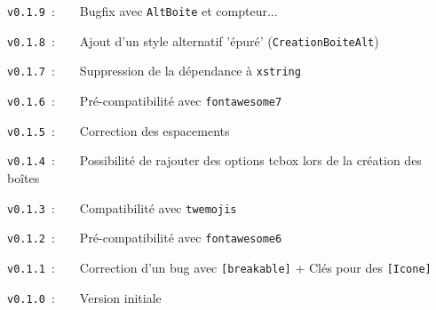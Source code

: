 \documentclass[french,11pt,a4paper]{article}
\begin{document}
\verb|v0.1.9|~:~~~~Bugfix avec \texttt{AltBoite} et compteur...

\verb|v0.1.8|~:~~~~Ajout d'un style alternatif 'épuré' (\texttt{CreationBoiteAlt})

\verb|v0.1.7|~:~~~~Suppression de la dépendance à \texttt{xstring}

\verb|v0.1.6|~:~~~~Pré-compatibilité avec \texttt{fontawesome7}

\verb|v0.1.5|~:~~~~Correction des espacements

\verb|v0.1.4|~:~~~~Possibilité de rajouter des options \textsf{tcbox} lors de la création des boîtes

\verb|v0.1.3|~:~~~~Compatibilité avec \texttt{twemojis}

\verb|v0.1.2|~:~~~~Pré-compatibilité avec \texttt{fontawesome6}

\verb|v0.1.1|~:~~~~Correction d'un bug avec \texttt{[breakable]} + Clés pour des \texttt{[Icone]}

\verb|v0.1.0|~:~~~~Version initiale

\vspace*{15mm}

\pagebreak
\end{document}
